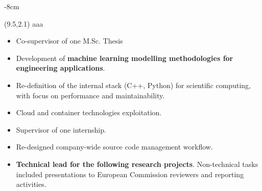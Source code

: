 \documentclass[10pt,a4paper]{altacv}
\begin{document}


\begin{adjustwidth}{}{-8cm}
\makecvheader
\end{adjustwidth}

\vspace{0.5cm}
\begin{textblock}{10}(9.5,2.1)
  \centering
	aaa
  \vspace{250mm}
\end{textblock}




\divider

\smallskip
\begin{itemize}
\item Co-supervisor of one M.Sc. Thesis
\end{itemize}


\begin{itemize}
\item Development of \textbf{machine learning modelling methodologies for engineering applications}.
\item Re-definition of the internal stack (C++, Python) for scientific computing, with focus on performance and maintainability.
\item Cloud and container technologies exploitation.
\item Supervisor of one internship.
\item Re-designed company-wide source code management workflow.
\item \textbf{Technical lead for the following research projects}. Non-technical tasks included presentations to European Commission reviewers and reporting activities.
\end{itemize}
\end{document}
